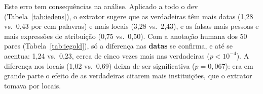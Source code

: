 Este erro tem consequências na análise. Aplicado a todo o dev (Tabela~\ref{tab:iedens}), o extrator
sugere que as verdadeiras têm mais datas (1,28 vs.\ 0,43 por cem palavras) e mais locais (3,28 vs.\
2,43), e as falsas mais pessoas e mais expressões de atribuição (0,75 vs.\ 0,50). Com a anotação
humana dos 50 pares (Tabela~\ref{tab:iegold}), só a diferença nas \textbf{datas} se confirma, e
até se acentua: 1,24 vs.\ 0,23, cerca de cinco vezes mais nas verdadeiras ($p<10^{-4}$). A
diferença nos locais (1,02 vs.\ 0,69) deixa de ser significativa ($p=0{,}067$): era em grande parte
o efeito de as verdadeiras citarem mais instituições, que o extrator tomava por locais.


